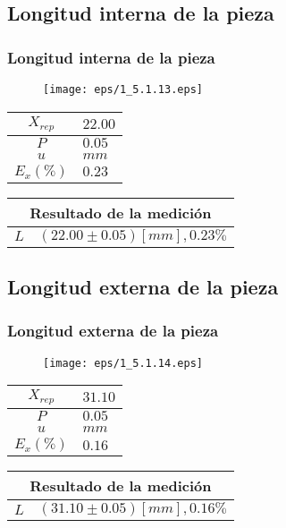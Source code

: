 \documentclass[letter,11pt]{beamer}
\begin{document}
\subsection{Longitud interna de la pieza}
\begin{frame}
\frametitle{Longitud interna de la pieza}
\vspace*{0.8cm}
\begin{figure}
\centering
\texttt{[image: eps/1\_5.1.13.eps]}
\end{figure}
\vspace*{0.4cm}
\scriptsize
\begin{tabular}{|c|>{\centering}m{1.8cm}<{\centering}|}
\hline
$X_{rep}$ &  $22.00$ \tabularnewline \hline
      $P$ &   $0.05$ \tabularnewline \hline
      $u$ &     $mm$ \tabularnewline \hline
$E_x(\%)$ &   $0.23$ \tabularnewline \hline
\end{tabular}
\quad
\begin{tabular}{|c|>{\centering}m{5.7cm}<{\centering}|}
\hline
\multicolumn{2}{|c|}{\textbf{Resultado de la medición}} \\ \hline
$L$ & $( 22.00\pm0.05)[mm], 0.23\%$ \tabularnewline \hline
\end{tabular}
\end{frame}

\subsection{Longitud externa de la pieza}
\begin{frame}
\frametitle{Longitud externa de la pieza}
\vspace*{0.8cm}
\begin{figure}
\centering
\texttt{[image: eps/1\_5.1.14.eps]}
\end{figure}
\vspace*{0.4cm}
\scriptsize
\begin{tabular}{|c|>{\centering}m{1.8cm}<{\centering}|}
\hline
$X_{rep}$ &  $31.10$ \tabularnewline \hline
      $P$ &   $0.05$ \tabularnewline \hline
      $u$ &     $mm$ \tabularnewline \hline
$E_x(\%)$ &   $0.16$ \tabularnewline \hline
\end{tabular}
\quad
\begin{tabular}{|c|>{\centering}m{5.7cm}<{\centering}|}
\hline
\multicolumn{2}{|c|}{\textbf{Resultado de la medición}} \\ \hline
$L$ & $( 31.10\pm0.05)[mm], 0.16\%$ \tabularnewline \hline
\end{tabular}
\end{frame}
\end{document}
